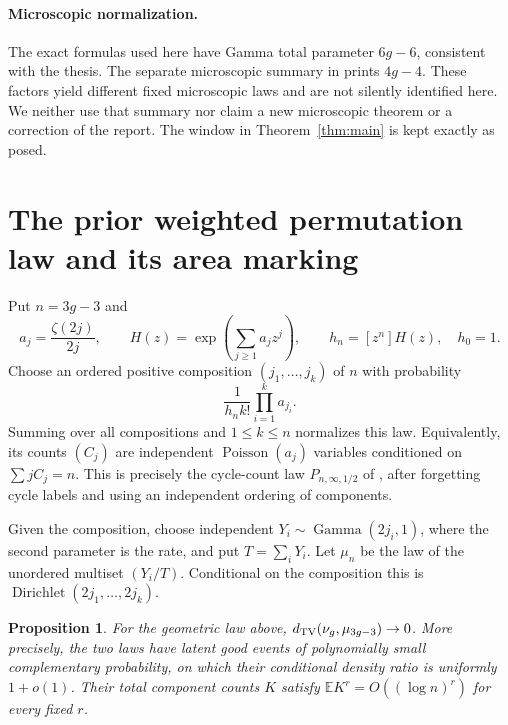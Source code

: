 \documentclass[11pt]{article}
\newtheorem{proposition}[theorem]{Proposition}
\theoremstyle{remark}\newtheorem{remark}[theorem]{Remark}
\newcommand{\E}{\mathbb E}\newcommand{\Prob}{\mathbb P}
\newcommand{\Poi}{\operatorname{Poisson}}\newcommand{\Gam}{\operatorname{Gamma}}
\newcommand{\Dir}{\operatorname{Dirichlet}}\newcommand{\PPP}{\operatorname{PPP}}
\begin{document}
\paragraph{Microscopic normalization.}
The exact formulas used here have Gamma total parameter $6g-6$, consistent with the thesis. The separate microscopic summary in \cite{OWR} prints $4g-4$. These factors yield different fixed microscopic laws and are not silently identified here. We neither use that summary nor claim a new microscopic theorem or a correction of the report. The window in Theorem~\ref{thm:main} is kept exactly as posed.

\section{The prior weighted permutation law and its area marking}

Put $n=3g-3$ and
\begin{equation}\label{eq:H}
 a_j=\frac{\zeta(2j)}{2j},\qquad H(z)=\exp\left(\sum_{j\ge1}a_jz^j\right),\qquad h_n=[z^n]H(z),\quad h_0=1.
\end{equation}
Choose an ordered positive composition $(j_1,\ldots,j_k)$ of $n$ with probability
\begin{equation}\label{eq:composition}
 \frac{1}{h_n k!}\prod_{i=1}^k a_{j_i}.
\end{equation}
Summing over all compositions and $1\le k\le n$ normalizes this law. Equivalently, its counts $(C_j)$ are independent $\Poi(a_j)$ variables conditioned on $\sum jC_j=n$. This is precisely the cycle-count law $P_{n,\infty,1/2}$ of \cite{DGZZ}, after forgetting cycle labels and using an independent ordering of components.

Given the composition, choose independent $Y_i\sim\Gam(2j_i,1)$, where the second parameter is the rate, and put $T=\sum_iY_i$. Let $\mu_n$ be the law of the unordered multiset $(Y_i/T)$. Conditional on the composition this is $\Dir(2j_1,\ldots,2j_k)$.

\begin{proposition}\label{prop:tv}
For the geometric law above, $d_{\mathrm{TV}}(\nu_g,\mu_{3g-3})\to0$. More precisely, the two laws have latent good events of polynomially small complementary probability, on which their conditional density ratio is uniformly $1+o(1)$. Their total component counts $K$ satisfy $\E K^r=O((\log n)^r)$ for every fixed $r$.
\end{proposition}
\end{document}

